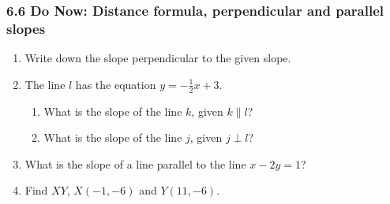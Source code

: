 \documentclass[12pt, twoside]{article}
\begin{document}
\subsubsection*{6.6 Do Now: Distance formula, perpendicular and parallel slopes}
  \begin{enumerate}

  \item Write down the slope perpendicular to the given slope.
  \begin{enumerate}
  \end{enumerate} \vspace{1cm}

  
  \item The line $l$ has the equation $y=-\frac{1}{2} x+3$.
  \begin{enumerate}
    \item What is the slope of the line $k$, given $k \parallel l$?
    \vspace{1.3cm}
    \item What is the slope of the line $j$, given $j \perp l$?
    \vspace{1.3cm}
  \end{enumerate}
  
  \item What is the slope of a line parallel to the line $x-2y=1$?  \vspace{2cm}
 
 
    \item Find $XY$, $X(-1,-6)$ and $Y(11,-6)$. \hspace{0.5cm}
     \vspace{1cm}


\end{enumerate}
\end{document}

